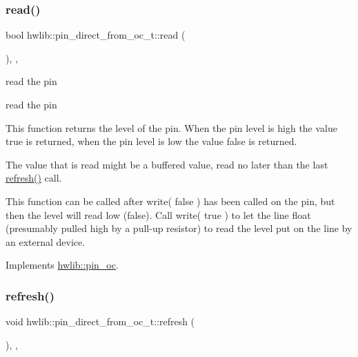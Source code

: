 \subsubsection{\texorpdfstring{read()}{read()}}
{\footnotesize\ttfamily bool hwlib\+::pin\+\_\+direct\+\_\+from\+\_\+oc\+\_\+t\+::read (\begin{DoxyParamCaption}{ }\end{DoxyParamCaption})\hspace{0.3cm}{\ttfamily [inline]}, {\ttfamily [override]}, {\ttfamily [virtual]}}





read the pin

read the pin

This function returns the level of the pin. When the pin level is high the value true is returned, when the pin level is low the value false is returned.

The value that is read might be a buffered value, read no later than the last \hyperlink{classhwlib_1_1pin__direct__from__oc__t_ab18895f60f0b8f314da92711176d3464}{refresh()} call.

This function can be called after write( false ) has been called on the pin, but then the level will read low (false). Call write( true ) to let the line float (presumably pulled high by a pull-\/up resistor) to read the level put on the line by an external device. 

Implements \hyperlink{classhwlib_1_1pin__oc_a51180afd605add59b96105fa98e29f88}{hwlib\+::pin\+\_\+oc}.

\mbox{\label{classhwlib_1_1pin__direct__from__oc__t_ab18895f60f0b8f314da92711176d3464}} 
\subsubsection{\texorpdfstring{refresh()}{refresh()}}
{\footnotesize\ttfamily void hwlib\+::pin\+\_\+direct\+\_\+from\+\_\+oc\+\_\+t\+::refresh (\begin{DoxyParamCaption}{ }\end{DoxyParamCaption})\hspace{0.3cm}{\ttfamily [inline]}, {\ttfamily [override]}, {\ttfamily [virtual]}}





